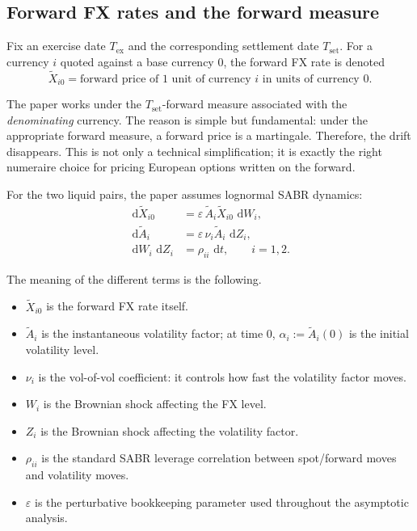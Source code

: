 \documentclass[11pt]{article}
\newcommand{\dd}{\,\mathrm{d}}
\newcommand{\eps}{\varepsilon}
\newcommand{\X}{\widetilde{X}}
\newcommand{\Vol}{\widetilde{A}}
\begin{document}
\subsection*{Forward FX rates and the forward measure}

Fix an exercise date \(T_{\mathrm{ex}}\) and the corresponding settlement date \(T_{\mathrm{set}}\). For a currency \(i\) quoted against a base currency \(0\), the forward FX rate is denoted
\[
\X_{i0}=\text{forward price of 1 unit of currency } i \text{ in units of currency }0.
\]

The paper works under the \(T_{\mathrm{set}}\)-forward measure associated with the \emph{denominating} currency. The reason is simple but fundamental: under the appropriate forward measure, a forward price is a martingale. Therefore, the drift disappears. This is not only a technical simplification; it is exactly the right numeraire choice for pricing European options written on the forward.

For the two liquid pairs, the paper assumes lognormal SABR dynamics:
\begin{align}
\dd \X_{i0} &= \eps\, \Vol_i \X_{i0}\,\dd W_i, \label{eq:sabrx} \\
\dd \Vol_i &= \eps\, \nu_i \Vol_i\,\dd Z_i, \label{eq:sabra} \\
\dd W_i\,\dd Z_i &= \rho_{ii}\,\dd t, \qquad i=1,2. \label{eq:sabrcorr}
\end{align}

The meaning of the different terms is the following.
\begin{itemize}
    \item \(\X_{i0}\) is the forward FX rate itself.
    \item \(\Vol_i\) is the instantaneous volatility factor; at time \(0\), \(\alpha_i:=\Vol_i(0)\) is the initial volatility level.
    \item \(\nu_i\) is the vol-of-vol coefficient: it controls how fast the volatility factor moves.
    \item \(W_i\) is the Brownian shock affecting the FX level.
    \item \(Z_i\) is the Brownian shock affecting the volatility factor.
    \item \(\rho_{ii}\) is the standard SABR leverage correlation between spot/forward moves and volatility moves.
    \item \(\eps\) is the perturbative bookkeeping parameter used throughout the asymptotic analysis.
\end{itemize}
\end{document}
